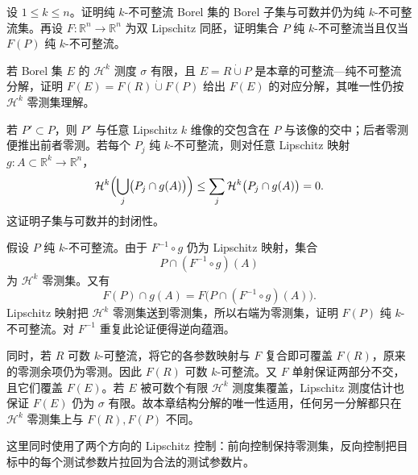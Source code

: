 \begin{optionalexercise}\label{b1:ex:19-pure-bilipschitz-decomposition}
设 \(1\le k\le n\)。证明纯 \(k\)-不可整流 Borel 集的 Borel 子集与可数并仍为纯 \(k\)-不可整流集。再设 \(F:\mathbb R^n\rightarrow\mathbb R^n\) 为双 Lipschitz 同胚，证明集合 \(P\) 纯 \(k\)-不可整流当且仅当 \(F(P)\) 纯 \(k\)-不可整流。

\ProseParagraphBreak

若 Borel 集 \(E\) 的 \(\mathcal H^k\) 测度 \(\sigma\) 有限，且 \(E=R\mathbin{\dot\cup}P\) 是本章的可整流—纯不可整流分解，证明 \(F(E)=F(R)\mathbin{\dot\cup}F(P)\) 给出 \(F(E)\) 的对应分解，其唯一性仍按 \(\mathcal H^k\) 零测集理解。
\end{optionalexercise}
\begin{solution}
若 \(P'\subset P\)，则 \(P'\) 与任意 Lipschitz \(k\) 维像的交包含在 \(P\) 与该像的交中；后者零测便推出前者零测。若每个 \(P_j\) 纯 \(k\)-不可整流，则对任意 Lipschitz 映射 \(g:A\subset\mathbb R^k\rightarrow\mathbb R^n\)，
\[
 \mathcal H^k\Bigl(\bigcup_j\bigl(P_j\cap g(A)\bigr)\Bigr)
 \le\sum_j\mathcal H^k\bigl(P_j\cap g(A)\bigr)=0.
\]
这证明子集与可数并的封闭性。

假设 \(P\) 纯 \(k\)-不可整流。由于 \(F^{-1}\circ g\) 仍为 Lipschitz 映射，集合
\[
 P\cap(F^{-1}\circ g)(A)
\]
为 \(\mathcal H^k\) 零测集。又有
\[
 F(P)\cap g(A)=F\bigl(P\cap(F^{-1}\circ g)(A)\bigr).
\]
Lipschitz 映射把 \(\mathcal H^k\) 零测集送到零测集，所以右端为零测集，证明 \(F(P)\) 纯 \(k\)-不可整流。对 \(F^{-1}\) 重复此论证便得逆向蕴涵。

同时，若 \(R\) 可数 \(k\)-可整流，将它的各参数映射与 \(F\) 复合即可覆盖 \(F(R)\)，原来的零测余项仍为零测。因此 \(F(R)\) 可数 \(k\)-可整流。又 \(F\) 单射保证两部分不交，且它们覆盖 \(F(E)\)。若 \(E\) 被可数个有限 \(\mathcal H^k\) 测度集覆盖，Lipschitz 测度估计也保证 \(F(E)\) 仍为 \(\sigma\) 有限。故本章结构分解的唯一性适用，任何另一分解都只在 \(\mathcal H^k\) 零测集上与 \(F(R),F(P)\) 不同。

这里同时使用了两个方向的 Lipschitz 控制：前向控制保持零测集，反向控制把目标中的每个测试参数片拉回为合法的测试参数片。
\end{solution}

